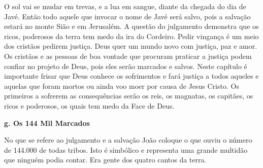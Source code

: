 \documentclass[
]{book}
\begin{document}
O sol vai se mudar em trevas, e a lua em sangue, diante da chegada do dia de Javé. Então todo aquele que invocar o nome de Javé será salvo, pois a salvação estará no monte Sião e em Jerusalém. A questão do julgamento demonstra que os ricos, poderosos da terra tem medo da ira do Cordeiro. Pedir vingança é um meio dos cristãos pedirem justiça. Deus quer um mundo novo com justiça, paz e amor. Os cristãos e as pessoas de boa vontade que procuram praticar a justiça podem confiar no projeto de Deus, pois eles serão marcados e salvos. Neste capítulo é importante frisar que Deus conhece os sofrimentos e fará justiça a todos aqueles e aquelas que foram mortos ou ainda voo moer por causa de Jesus Cristo. Os primeiros a sofrerem as consequências serão os reis, os magnatas, os capitães, os ricos e poderosos, os quais tem medo da Face de Deus.

\textbf{g. Os 144 Mil Marcados}

No que se refere ao julgamento e a salvação João coloque o que ouviu o número de 144.000 de todas tribos. Isto é simbólico e representa uma grande multidão que ninguém podia contar. Era gente dos quatro cantos da terra.
\end{document}
